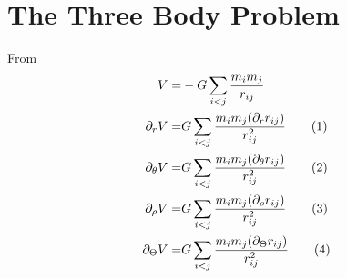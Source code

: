 \documentclass[]{article}
\newcommand\numberthis{\addtocounter{equation}{1}\tag{\theequation}}
\begin{document}
\section {The Three Body Problem}

From \cite[(24)]{kotovych2002exactly}
\begin{align*}
	V =& -G \sum_{i<j}\frac{m_i m_j}{r_{ij}}\\
	\partial_r V =& G \sum_{i<j}\frac{m_i m_j(\partial_r r_{ij})}{r_{ij}^2} \numberthis \label{eq:V:r}\\
	\partial_{\theta} V =& G \sum_{i<j}\frac{m_i m_j(\partial_{\theta} r_{ij})}{r_{ij}^2}  \numberthis \label{eq:V:theta}\\
	\partial_{\rho} V =& G \sum_{i<j}\frac{m_i m_j(\partial_{\rho} r_{ij})}{r_{ij}^2} \numberthis \label{eq:V:rho}\\
	\partial_{\Theta} V =& G \sum_{i<j}\frac{m_i m_j(\partial_{\Theta} r_{ij})}{r_{ij}^2}  \numberthis \label{eq:V:Theta}
\end{align*}
\end{document}
